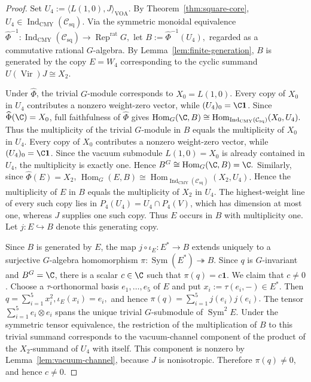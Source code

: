 \documentclass[12pt,leqno]{amsart}
\numberwithin{equation}{section} \newtheorem{thm}{Theorem}[section] \newtheorem{lem}[thm]{Lemma} \newtheorem{ex}[thm]{Example} \newtheorem{prop}[thm]{Proposition} \newtheorem{cor}[thm]{Corollary} \newtheorem{defi}[thm]{Definition} \newtheorem{rmk}[thm]{Remark} \newtheorem{notation}[thm]{Notation}
\newcommand{\one}{\mathbf{1}}
\newcommand{\Vir}{\operatorname{Vir}}
\newcommand{\Rep}{\operatorname{Rep}}
\newcommand{\Sym}{\operatorname{Sym}}
\newcommand{\Hom}{\operatorname{Hom}}
\newcommand{\Csq}{\mathcal C_{\mathrm{sq}}}
\newcommand{\IndCMY}{\operatorname{Ind}_{\mathrm{CMY}}}
\begin{document}
\begin{proof}
Set \(U_4:=\langle L(1,0),J\rangle_{\mathrm{VOA}}.\) By Theorem~\ref{thm:square-core}, $U_4\in\IndCMY(\Csq)$. Via the symmetric monoidal equivalence \(\widehat\Phi^{-1}:\IndCMY(\Csq)\to\Rep^{\mathrm{rat}}G,\) let \(B:=\widehat\Phi^{-1}(U_4),\) regarded as a commutative rational $G$-algebra. By Lemma~\ref{lem:finite-generation}, $B$ is generated by the copy $E=W_4$ corresponding to the cyclic summand $U(\Vir)J\cong X_2$.

Under $\widehat\Phi$, the trivial $G$-module corresponds to $X_0=L(1,0)$. Every copy of $X_0$ in $U_4$ contributes a nonzero weight-zero vector, while $(U_4)_0=\C\one$. Since $\widehat\Phi(\C)=X_0$, full faithfulness of $\widehat\Phi$ gives \(\Hom_G(\C,B)\cong\Hom_{\IndCMY(\Csq)}(X_0,U_4).\) Thus the multiplicity of the trivial $G$-module in $B$ equals the multiplicity of $X_0$ in $U_4$. Every copy of $X_0$ contributes a nonzero weight-zero vector, while $(U_4)_0=\C\one$. Since the vacuum submodule $L(1,0)=X_0$ is already contained in $U_4$, the multiplicity is exactly one. Hence \(B^G\cong\Hom_G(\C,B)=\C.\) Similarly, since $\widehat\Phi(E)=X_2$, \(\Hom_G(E,B)\cong\Hom_{\IndCMY(\Csq)}(X_2,U_4).\) Hence the multiplicity of $E$ in $B$ equals the multiplicity of $X_2$ in $U_4$. The highest-weight line of every such copy lies in \(P_4(U_4)=U_4\cap P_4(V)\), which has dimension at most one, whereas $J$ supplies one such copy. Thus $E$ occurs in $B$ with multiplicity one. Let \(j:E\hookrightarrow B\) denote this generating copy.

Since $B$ is generated by $E$, the map \(j\circ\iota_E:E^*\longrightarrow B\) extends uniquely to a surjective $G$-algebra homomorphism \(\pi:\Sym(E^*)\twoheadrightarrow B.\) Since $q$ is $G$-invariant and $B^G=\C$, there is a scalar $c\in\C$ such that $\pi(q)=c\one$. We claim that $c\ne0$. Choose a $\tau$-orthonormal basis $e_1,\ldots,e_5$ of $E$ and put $x_i:=\tau(e_i,-)\in E^*$. Then \(q=\sum_{i=1}^5 x_i^2,\iota_E(x_i)=e_i,\) and hence \(\pi(q)=\sum_{i=1}^5 j(e_i)j(e_i).\) The tensor \(\sum_{i=1}^5 e_i\otimes e_i\) spans the unique trivial $G$-submodule of $\Sym^2E$. Under the symmetric tensor equivalence, the restriction of the multiplication of $B$ to this trivial summand corresponds to the vacuum-channel component of the product of the $X_2$-summand of $U_4$ with itself. This component is nonzero by Lemma~\ref{lem:vacuum-channel}, because $J$ is nonisotropic. Therefore \(\pi(q)\ne0\), and hence $c\ne0$.


\end{proof}
\end{document}
